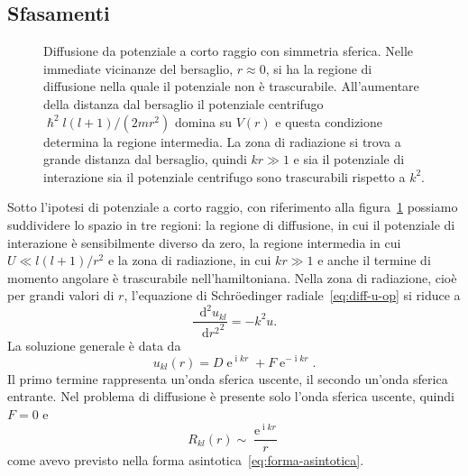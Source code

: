 \documentclass[a4paper,fleqn,twoside,12pt]{article}
\newcommand*{\dd}{\mathop{}\!\mathrm{d}} %
\DeclareMathOperator{\e}{\mathrm{e}} %
\DeclareMathOperator{\uimm}{\mathrm{i}} %
\newcommand*{\toder}[3][]{\frac{{\dd^{#1}}#2}{\dd {#3}^{#1}}}
\begin{document}
\subsection{Sfasamenti}
\label{sec:sfasamenti}

\begin{figure}
  \centering
  \caption{Diffusione da potenziale a corto raggio con simmetria sferica.  Nelle
    immediate vicinanze del bersaglio, $r \approx 0$, si ha la regione di
    diffusione nella quale il potenziale non è trascurabile.  All'aumentare
    della distanza dal bersaglio il potenziale centrifugo
    $\hslash^2 l(l+1)/(2mr^2)$ domina su $V(r)$ e questa condizione determina la
    regione intermedia.  La zona di radiazione si trova a grande distanza dal
    bersaglio, quindi $kr \gg 1$ e sia il potenziale di interazione sia il
    potenziale centrifugo sono trascurabili rispetto a $k^2$.}
\label{fig:regioni-potenziale-sferico}
\end{figure}
Sotto l'ipotesi di potenziale a corto raggio, con riferimento alla
figura~\ref{fig:regioni-potenziale-sferico} possiamo suddividere lo spazio in
tre regioni: la regione di diffusione, in cui il potenziale di interazione è
sensibilmente diverso da zero, la regione intermedia in cui $U \ll l(l+1)/r^{2}$
e la zona di radiazione, in cui $kr \gg 1$ e anche il termine di momento
angolare è trascurabile nell'hamiltoniana.  Nella zona di radiazione, cioè per
grandi valori di $r$, l'equazione di Schröedinger radiale~\eqref{eq:diff-u-op}
si riduce a
\begin{equation}
  \toder[2]{u_{kl}}{r^{2}} = -k^{2}u.
\end{equation}
La soluzione generale è data da
\begin{equation}
  u_{kl}(r) = D\e^{\uimm kr} + F\e^{-\uimm kr}.
\end{equation}
Il primo termine rappresenta un'onda sferica uscente, il secondo un'onda sferica
entrante.  Nel problema di diffusione è presente solo l'onda sferica uscente,
quindi $F = 0$ e
\begin{equation}
  R_{kl}(r) \sim \frac{\e^{\uimm kr}}{r}
\end{equation}
come avevo previsto nella forma asintotica~\eqref{eq:forma-asintotica}.
\end{document}
